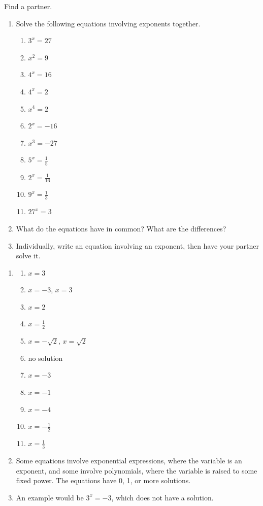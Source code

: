 \documentclass[noauthor]{ximera}
\begin{document}
\begin{problem}
Find a partner.

\begin{enumerate}
    \item Solve the following equations involving exponents together.
    \begin{enumerate}
        \item \(3^x = 27\)
        \item \(x^2 = 9\)
        \item \(4^x = 16\)
        \item \(4^x = 2\)
        \item \(x^4 = 2\)
        \item \(2^x = -16\)
        \item \(x^3 = -27\)
        \item \(5^x = \frac{1}{5}\)
        \item \(2^x = \frac{1}{16}\)
        \item \(9^x = \frac{1}{3}\)
        \item \(27^x = 3\)
    \end{enumerate}
    \item What do the equations have in common? What are the differences?
    \item Individually, write an equation involving an exponent, then have your partner solve it.
\end{enumerate}

\begin{explanation}
\begin{enumerate}
\item \begin{enumerate}
\item \(x = 3\)
\item \(x = -3\), \(x = 3\)
\item \(x = 2\)
\item \(x = \frac{1}{2}\)
\item \(x = -\sqrt{2}\), \(x = \sqrt{2}\)
\item no solution
\item \(x = -3\)
\item \(x = -1\)
\item \(x = -4\)
\item \(x = -\frac{1}{2}\)
\item \(x = \frac{1}{3}\)
\end{enumerate}
\item Some equations involve exponential expressions, where the 
variable is an exponent, and some involve polynomials, where the variable
is raised to some fixed power. The equations have 0, 1, or more solutions.
\item An example would be \(3^x = -3\), which does not have a solution.
\end{enumerate}
\end{explanation}
\end{problem}
\end{document}
